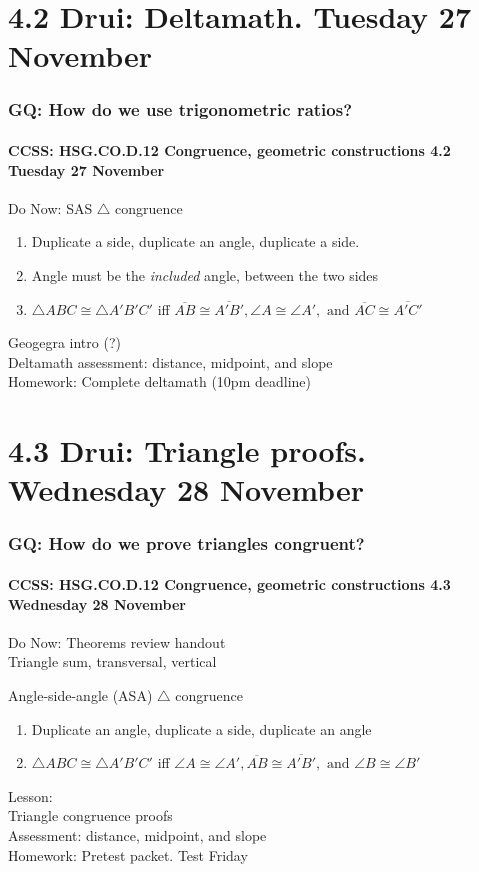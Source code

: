 \documentclass{beamer}
\begin{document}
  \section{4.2 Drui: Deltamath. Tuesday 27 November}
    \frame
    {
      \frametitle{GQ: How do we use trigonometric ratios?}
      \framesubtitle{CCSS: HSG.CO.D.12 Congruence, geometric constructions  \alert{4.2 Tuesday 27 November}}

      \begin{block}{Do Now: SAS $\triangle$ congruence}
      \begin{enumerate}
          \item Duplicate a side, duplicate an angle, duplicate a side.
          \item Angle must be the \emph{included} angle, between the two sides
          \item $\triangle ABC \cong \triangle A'B'C'$ iff $\overline{AB} \cong \overline{A'B'}, \angle A \cong \angle A', \text{ and } \overline{AC} \cong \overline{A'C'}$
      \end{enumerate}
      \end{block}
      Geogegra intro (?)\\
      Deltamath assessment: distance, midpoint, and slope\\[0.5cm]
      Homework: Complete deltamath (10pm deadline)
    }


  \section{4.3 Drui: Triangle proofs. Wednesday 28 November}
    \frame
    {
      \frametitle{GQ: How do we prove triangles congruent?}
      \framesubtitle{CCSS: HSG.CO.D.12 Congruence, geometric constructions  \alert{4.3 Wednesday 28 November}}
      Do Now: Theorems review handout \\
      Triangle sum, transversal, vertical
      \begin{block}{Angle-side-angle (ASA) $\triangle$ congruence}
      \begin{enumerate}
          \item Duplicate an angle, duplicate a side, duplicate an angle
          \item $\triangle ABC \cong \triangle A'B'C'$ iff $\angle A \cong \angle A', \overline{AB} \cong \overline{A'B'}, \text{ and } \angle B \cong \angle B'$
      \end{enumerate}
      \end{block}
      Lesson: \\
      Triangle congruence proofs\\
      Assessment: distance, midpoint, and slope\\[0.5cm]
      Homework: Pretest packet. \alert{Test Friday}
    }
\end{document}

